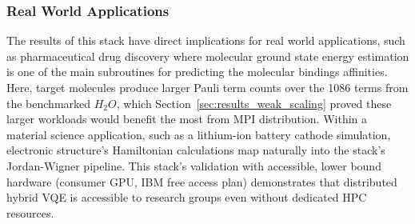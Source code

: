 
\subsubsection{Real World Applications}
The results of this stack have direct implications for real world applications, such as pharmaceutical drug discovery
where molecular ground state energy estimation is one of the main subroutines for predicting the molecular bindings affinities. 
Here, target molecules produce larger Pauli term counts over the 1086 terms from the benchmarked $H_{2}O$, which Section~\ref{sec:results_weak_scaling} 
proved these larger workloads would benefit the most from MPI distribution. Within a material science application, such as a lithium-ion battery
cathode simulation, electronic structure's Hamiltonian calculations map naturally into the stack's Jordan-Wigner pipeline. This stack's validation with 
accessible, lower bound hardware (consumer GPU, IBM free access plan) demonstrates that distributed hybrid VQE is accessible to research groups even without dedicated HPC resources. 